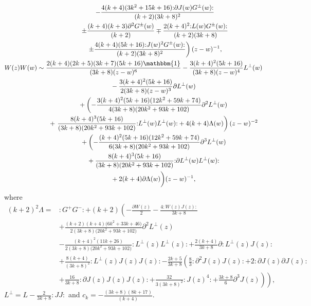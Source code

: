 \documentclass[pdftex]{sigma}
\numberwithin{equation}{section}
\begin{document}
\begin{gather*}
\phantom{ W(z)G^{\pm}(w) \sim }{}	 \left. - \frac{4(k+4)(3k^2+15k+16){:}\partial J(w)G^{\pm}(w){:}}{(k+2)(3k+8)^2}\right.\\
 \phantom{ W(z)G^{\pm}(w) \sim }{}\left. \pm \frac{(k+4)(k+3)\partial ^2G^{\pm}(w)}{(k+2)}\mp \frac{2(k+4)^2{:}L(w)G^{\pm}(w){:}}{(k+2)(3k+8)}\right. \\
	 \phantom{ W(z)G^{\pm}(w) \sim }{} \left. \pm \frac{4(k+4)(5k+16){:}J(w)^2G^{\pm}(w){:}}{(k+2)(3k+8)^2} \right)(z-w)^{-1} , \\
	 W(z)W(w) \sim \frac{2(k+4)(2k+5)(3k+7)(5k+16)\mathbbm{1}}{(3k+8)(z-w)^{6}} -\frac{3(k + 4)^2( 5 k + 16)}{(3k+8)(z-w)^{4}}L^{\perp}(w) \\
\phantom{W(z)W(w) \sim}{}	 -\frac{3(k + 4)^2( 5 k + 16)}{2(3k+8)(z-w)^{3}}\partial L^{\perp}(w) \\
\phantom{W(z)W(w) \sim}{}+\left( -\frac{3(k + 4)^2( 5 k + 16)(12k^2 + 59k + 74)}{4(3k+8)(20k^2 + 93k + 102)}\partial^2L ^{\perp}(w)\right. \\
\phantom{W(z)W(w) \sim}{}	 + \left. \frac{8(k + 4)^3( 5 k + 16)}{(3k+8)(20k^2 + 93k + 102)}{:}L^{\perp}(w)L^{\perp}(w){:} + 4 (k+4) \Lambda (w)\right) (z-w)^{-2} \\
\phantom{W(z)W(w) \sim}{}	 + \biggl( -\frac{(k + 4)^2( 5 k + 16)(12k^2 + 59k + 74)}{6(3k+8)(20k^2 + 93k + 102)}\partial ^3L^{\perp}(w) \\
\phantom{W(z)W(w) \sim}{}	 +   \frac{8(k + 4)^3( 5 k + 16)}{(3k+8)(20k^2 + 93k + 102)}{:}\partial L^{\perp}(w)L^{\perp}(w){:} \\
\phantom{W(z)W(w) \sim}{}  + 2 (k+4) \partial \Lambda(w)\biggr)(z-w)^{-1},
\end{gather*}
 where
 \begin{align*}
 	(k+2)^2\Lambda = {}&{:} G^+ G^-{:} + (k+2) \left(-\frac{\partial W(z)}{2} -\frac{4 {:}W(z)J(z){:}}{3k+8}\right. \\
 &\left.+ \frac{(k+2)(k+4)\bigl(6k^2+33k+46\bigr)}{2(3k+8)\bigl(20k^2+93k+102\bigr)}\partial^2L^{\perp}(z)\right. \\
 	 &- \left. \frac{(k+4)^2(11k+26)}{2(3k+8)\bigl(20k^2+93k+102\bigr)}{:}L^{\perp}(z)L^{\perp}(z){:} + \frac{2(k+4)}{3k+8}\partial {:}L^{\perp}(z)J(z){:} \right.\\
 	 &+ \left. \frac{8(k+4)}{(3k+8)^2}{:}L^{\perp}(z)J(z)J(z){:} - \frac{2k+5}{3k+8}\left(\frac{8}{3}{:}\partial ^2J(z)J(z){:} + 2{:}\partial J(z)\partial J(z){:}\right. \right. \\
 	 &+ \left. \left. \frac{16}{3k+8}{:}\partial J(z)J(z)J(z){:} + \frac{32}{3(3k+8)^2}{:}J(z)^4{:} + \frac{3k+8}{6}\partial ^3J(z)\right) \right),
 \end{align*}
 $L^{\perp} = L-\frac{2}{3k+8}{:}JJ{:}$ and $c_k = -\frac{(3k+8)(8k+17)}{(k+4)}$.
\end{document}
